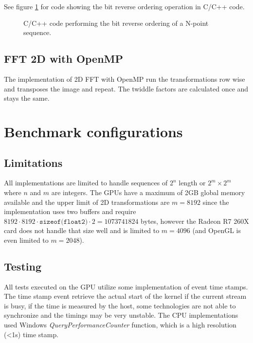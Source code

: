 See figure \ref{fig:omp:bit-reverse-order} for code showing the bit reverse ordering operation in C/C++ code.

\begin{figure}[h!]
	\centering
	\begin{framed}
			
	\end{framed}
	\caption{ C/C++ code performing the bit reverse ordering of a N-point sequence. }
	\label{fig:omp:bit-reverse-order}
\end{figure}

\subsection{FFT 2D with OpenMP}

The implementation of 2D FFT with OpenMP run the transformations row wise and transposes the image and repeat. The twiddle factors are calculated once and stays the same.

\section{Benchmark configurations}

\subsection{Limitations}

All implementations are limited to handle sequences of $2^n$ length or $2^m \times 2^m$ where $n$ and $m$ are integers. The GPUs have a maximum of 2GB global memory available and the upper limit of 2D transformations are $m = 8192$ since the implementation uses two buffers and require $8192 \cdot 8192 \cdot \texttt{sizeof(float2)} \cdot 2 = 1073741824$ bytes, however the Radeon R7 260X card does not handle that size well and is limited to $m = 4096$ (and OpenGL is even limited to $m = 2048$).

\subsection{Testing}

All tests executed on the GPU utilize some implementation of event time stamps. The time stamp event retrieve the actual start of the kernel if the current stream is busy, if the time is measured by the host, some technologies are not able to synchronize and the timings may be very unstable. The CPU implementations used Windows \textit{QueryPerformanceCounter} function, which is a high resolution (<1{\micro}s) time stamp.

